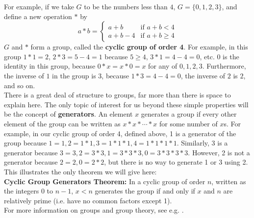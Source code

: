 \documentclass[11pt]{article}
\begin{document}
For example, if we take $G$ to be the numbers less than $4$, $G = \{0,1,2,3\}$, and define a new operation $*$ by $$a*b = \begin{cases} a+b & \text{if } a+b < 4 \\ a+b-4 & \text{if } a+b \geq 4 \end{cases}$$
$G$ and $*$ form a group, called the \textbf{cyclic group of order 4}. For example, in this group $1*1 = 2$, $2 * 3 = 5-4 = 1$ because $5 \geq 4$, $3*1 = 4-4 = 0$, etc. $0$ is the identity in this group, because $0*x = x*0 = x$ for any of $0,1,2,3$. Furthermore, the inverse of $1$ in the group is $3$, because $1*3 = 4-4 = 0$, the inverse of $2$ is $2$, and so on.\\[11pt]
There is a great deal of structure to groups, far more than there is space to explain here. The only topic of interest for us beyond these simple properties will be the concept of \textbf{generators}. An element $x$ generates a group if every other element of the group can be written as $x*x*\cdots*x$ for some number of $x$s. For example, in our cyclic group of order 4, defined above, 1 is a generator of the group because $1 = 1, 2 = 1 * 1, 3 = 1 * 1 * 1, 4 = 1 * 1 * 1 * 1$. Similarly, 3 is a generator because $3 = 3, 2 = 3 * 3, 1 = 3 * 3 * 3, 0 = 3 * 3 * 3 * 3$. However, 2 is not a generator because $2 = 2, 0 = 2 * 2$, but there is no way to generate 1 or 3 using 2. This illustrates the only theorem we will give here: \\[11pt]
\textbf{Cyclic Group Generators Theorem:} In a cyclic group of order $n$, written as the integers $0$ to $n-1$, $x < n$ generates the group if and only if $x$ and $n$ are relatively prime (i.e. have no common factors except 1). \\[11pt] 
For more information on groups and group theory, see e.g. \cite{Lang2002}.
 
\end{document}
